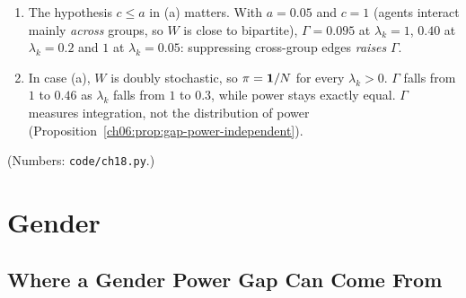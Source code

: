 \documentclass[../structural_economics_book.tex]{subfiles}
\begin{document}
\begin{remark}\label{ch18:rem:assortative_limits}
\begin{enumerate}
\item The hypothesis $c \le a$ in (a) matters. With $a = 0.05$ and $c = 1$ (agents interact mainly \emph{across} groups, so $W$ is close to bipartite), $\Gamma = 0.095$ at $\lambda_k = 1$, $0.40$ at $\lambda_k = 0.2$ and $1$ at $\lambda_k = 0.05$: suppressing cross-group edges \emph{raises} $\Gamma$.
\item In case (a), $W$ is doubly stochastic, so $\pi = \mathbf{1}/N$ for every $\lambda_k > 0$. $\Gamma$ falls from $1$ to $0.46$ as $\lambda_k$ falls from $1$ to $0.3$, while power stays exactly equal. $\Gamma$ measures integration, not the distribution of power (Proposition~\ref{ch06:prop:gap-power-independent}).
\end{enumerate}
(Numbers: \texttt{code/ch18.py}.)
\end{remark}


\section{Gender}
\label{ch18:sec:gender}

\subsection{Where a Gender Power Gap Can Come From}
\end{document}
